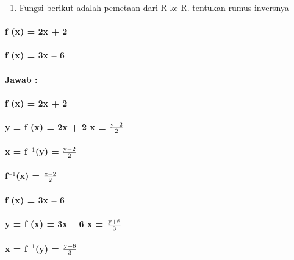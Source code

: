 \documentclass[11pt,fleqn]{book} %
\begin{document}
\begin{myEnumerate}
\begin{itemize}
\noindent 

\begin{enumerate}
\item  Fungsi berikut adalah pemetaan dari R ke R. tentukan rumus inversnya
\end{enumerate}


\paragraph{ f (x) = 2x + 2}


\paragraph{ f (x) = 3x -- 6}

\noindent 
\paragraph{Jawab :}


\paragraph{ f (x) = 2x + 2}

\noindent 
\paragraph{y = f (x) = 2x + 2   x = $\frac{{\rm y}-2}{2} $}


\paragraph{x = f${}^{-1}$(y) = $\frac{{\rm y}-2}{2} $}

\noindent 
\paragraph{f${}^{-1}$(x) = $\frac{{\rm x}-2}{2} $ }


\paragraph{ f (x) = 3x -- 6 }

\noindent 
\paragraph{y = f (x) = 3x -- 6   x = $\frac{{\rm y}+6}{3} $}

\noindent 
\paragraph{x = f${}^{-1}$(y) = $\frac{{\rm y}+6}{3} $}


\end{itemize}
\end{myEnumerate}
\end{document}

